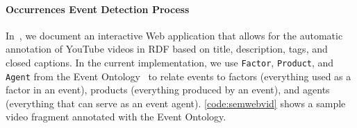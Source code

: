 \documentclass[runningheads,a4paper]{llncs}
\begin{document}

\paragraph{Occurrences Event Detection Process}
In~\cite{semwebvid}, we document an interactive Web application that allows for the automatic annotation of YouTube videos in RDF based on title, description, tags, and closed captions. In the current implementation, we use \texttt{Factor}, \texttt{Product}, and \texttt{Agent} from the Event Ontology~\cite{Raimond:Event} to relate events to factors (everything used as a factor in an event), products (everything produced by an event), and agents (everything that can serve as an event agent). \autoref{code:semwebvid} shows a sample video fragment annotated with the Event Ontology.
\end{document}
